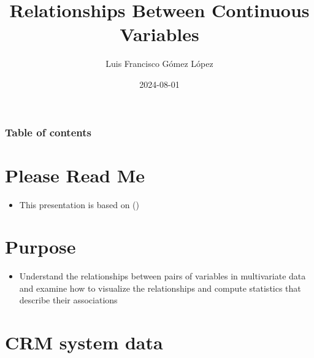 \documentclass[
  ignorenonframetext,
]{beamer}
\title{Relationships Between Continuous Variables}
\author{Luis Francisco Gómez López}
\date{2024-08-01}
\institute{FAEDIS}
\providecommand{\tightlist}{%
  \setlength{\itemsep}{0pt}\setlength{\parskip}{0pt}}\usepackage{longtable,booktabs,array}
\renewcommand*\contentsname{Table of contents}
\newcommand\contentsname{Table of contents}
\begin{document}
\frame{\titlepage}

\renewcommand*\contentsname{Table of contents}
\begin{frame}[allowframebreaks]
  \frametitle{Table of contents}
  \tableofcontents[hideallsubsections]
\end{frame}

\section{Please Read Me}\label{please-read-me}

\begin{frame}{}
\label{section}
\begin{itemize}
\tightlist
\item
  This presentation is based on ()
\end{itemize}
\end{frame}

\section{Purpose}\label{purpose}

\begin{frame}{}
\label{section-1}
\begin{itemize}
\tightlist
\item
  Understand the relationships between pairs of variables in
  multivariate data and examine how to visualize the relationships and
  compute statistics that describe their associations
\end{itemize}
\end{frame}

\section{CRM system data}\label{crm-system-data}
\end{document}
